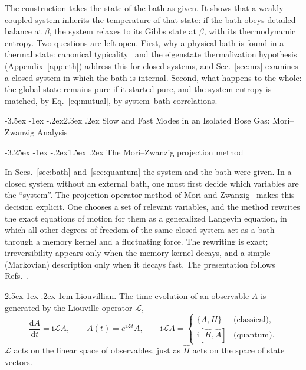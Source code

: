 \documentclass[10pt,a4paper]{article}
\makeatletter
\renewcommand{\section}{\@startsection{section}{1}{\z@}%
  {-3.5ex \@plus -1ex \@minus -.2ex}{2.3ex \@plus .2ex}%
  {\normalfont\fontsize{18pt}{22pt}\selectfont\bfseries}}
\renewcommand{\subsection}{\@startsection{subsection}{2}{\z@}%
  {-3.25ex \@plus -1ex \@minus -.2ex}{1.5ex \@plus .2ex}%
  {\normalfont\fontsize{15.5pt}{19pt}\selectfont\bfseries}}
\renewcommand{\paragraph}{\@startsection{paragraph}{4}{\z@}%
  {2.5ex \@plus 1ex \@minus .2ex}{-1em}%
  {\normalfont\fontsize{14pt}{17pt}\selectfont\bfseries}}
\newcommand{\dd}{\mathrm{d}}
\newcommand{\ii}{\mathrm{i}}
\newcommand{\LL}{\mathcal{L}}
\makeatother
\begin{document}
The construction takes the state of the bath as given.
It shows that a weakly coupled system inherits the temperature of that state: if the bath obeys detailed balance at $ \beta $, the system relaxes to its Gibbs state at $ \beta $, with its thermodynamic entropy.
Two questions are left open.
First, why a physical bath is found in a thermal state: canonical typicality~\cite{Goldstein2006,Popescu2006} and the eigenstate thermalization hypothesis~\cite{Deutsch1991,Srednicki1994,Rigol2008,DAlessio2016} (Appendix~\ref{app:eth}) address this for closed systems, and Sec.~\ref{sec:mz} examines a closed system in which the bath is internal.
Second, what happens to the whole: the global state remains pure if it started pure, and the system entropy is matched, by Eq.~\eqref{eq:mutual}, by system--bath correlations.

\section{Slow and Fast Modes in an Isolated Bose Gas: Mori--Zwanzig Analysis}
\label{sec:mz}

\subsection{The Mori--Zwanzig projection method}
\label{sec:mz-method}

In Secs.~\ref{sec:bath} and~\ref{sec:quantum} the system and the bath were given.
In a closed system without an external bath, one must first decide which variables are the ``system''.
The projection-operator method of Mori and Zwanzig~\cite{Nakajima1958,Zwanzig1960,Zwanzig1961,Mori1965} makes this decision explicit.
One chooses a set of relevant variables, and the method rewrites the exact equations of motion for them as a generalized Langevin equation, in which all other degrees of freedom of the same closed system act as a bath through a memory kernel and a fluctuating force.
The rewriting is exact; irreversibility appears only when the memory kernel decays, and a simple (Markovian) description only when it decays fast.
The presentation follows Refs.~\cite{Forster1975,Zwanzig2001,Grabert1982}.

\paragraph{Liouvillian.}
The time evolution of an observable $ A $ is generated by the Liouville operator $ \LL $,
\begin{equation}
  \frac{\dd A}{\dd t} = \ii \LL A ,
  \qquad
  A(t) = e^{\ii\LL t} A ,
  \qquad
  \ii\LL A =
  \begin{cases}
    \{ A , H \} & \text{(classical)} , \\
    \ii [ \hat H , \hat A ] & \text{(quantum)} .
  \end{cases}
  \label{eq:liouvillian}
\end{equation}
$ \LL $ acts on the linear space of observables, just as $ \hat H $ acts on the space of state vectors.
\end{document}
